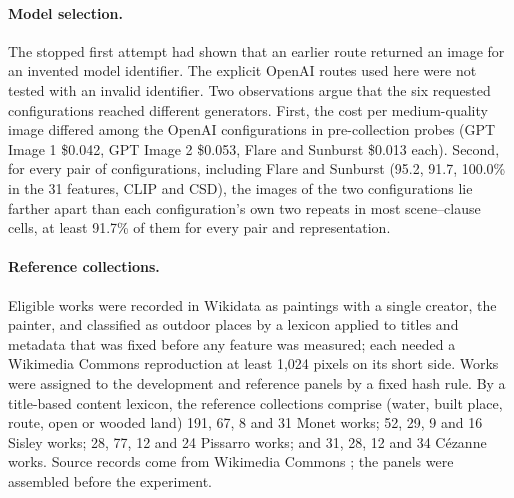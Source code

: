 \paragraph{Model selection.} The stopped first attempt had shown that an earlier route returned an
image for an invented model identifier. The explicit OpenAI routes used here were not tested with
an invalid identifier. Two observations argue that the six requested configurations reached
different generators. First, the cost per medium-quality image differed among the OpenAI
configurations in pre-collection probes (GPT Image 1 \$0.042, GPT Image 2 \$0.053, Flare and
Sunburst \$0.013 each). Second, for every pair of configurations, including Flare and Sunburst (95.2,
91.7, 100.0\% in the 31 features, CLIP and CSD), the images of the two configurations lie farther
apart than each configuration's own two repeats in most scene--clause cells, at least 91.7\% of them
for every pair and representation.

\paragraph{Reference collections.}
Eligible works were recorded in Wikidata as paintings with a single creator, the painter, and
classified as outdoor places by a lexicon applied to titles and metadata that was fixed before
any feature was measured; each needed a Wikimedia Commons reproduction at least 1,024 pixels on
its short side. Works were assigned to the development and reference panels by a fixed hash
rule. By a title-based content lexicon, the reference collections comprise (water, built place,
route, open or wooded land) 191, 67, 8 and 31 Monet works; 52, 29, 9 and 16 Sisley works; 28,
77, 12 and 24 Pissarro works; and 31, 28, 12 and 34 C\'ezanne works. Source records come from Wikimedia
Commons \citep{wikimediacommons}; the panels were assembled before the experiment.

